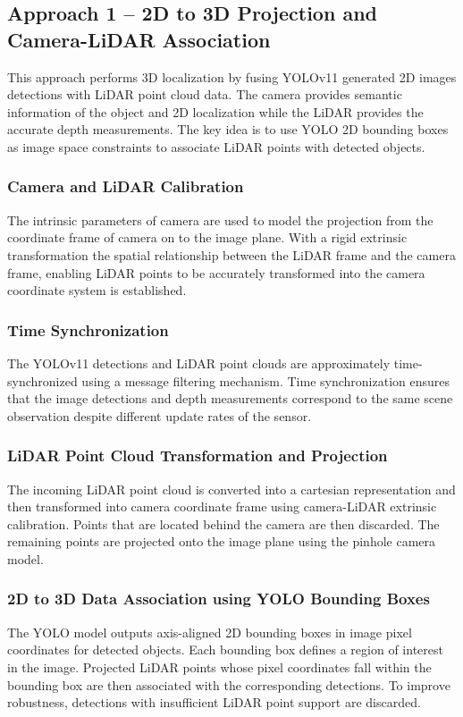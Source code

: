 \documentclass[12pt,a4paper]{report}
\begin{document}
\subsection{Approach 1 -- 2D to 3D Projection and Camera-LiDAR Association}
This approach performs 3D localization by fusing YOLOv11 generated 2D images detections with LiDAR point cloud data. The camera provides semantic information of the object and 2D localization while the LiDAR provides the accurate depth measurements. The key idea is to use YOLO 2D bounding boxes as image space constraints to associate LiDAR points with detected objects.

\subsubsection{Camera and LiDAR Calibration}
The intrinsic parameters of camera are used to model the projection from the coordinate frame of camera on to the image plane. With a rigid extrinsic transformation the spatial relationship between the LiDAR frame and the camera frame, enabling LiDAR points to be accurately transformed into the camera coordinate system is established.

\subsubsection{Time Synchronization}
The YOLOv11 detections and LiDAR point clouds are approximately time-synchronized using a message filtering mechanism. Time synchronization ensures that the image detections and depth measurements correspond to the same scene observation despite different update rates of the sensor.

\subsubsection{LiDAR Point Cloud Transformation and Projection}
The incoming LiDAR point cloud is converted into a cartesian representation and then transformed into camera coordinate frame using camera-LiDAR extrinsic calibration. Points that are located behind the camera are then discarded. The remaining points are projected onto the image plane using the pinhole camera model.

\subsubsection{2D to 3D Data Association using YOLO Bounding Boxes}
The YOLO model outputs axis-aligned 2D bounding boxes in image pixel coordinates for detected objects. Each bounding box defines a region of interest in the image. Projected LiDAR points whose pixel coordinates fall within the bounding box are then associated with the corresponding detections. To improve robustness, detections with insufficient LiDAR point support are discarded.
\end{document}
